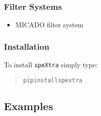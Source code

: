 \subsubsection{Filter Systems%
  \label{filter-systems}%
}

\begin{itemize}
\item MICADO filter system
\end{itemize}


\subsubsection{Installation%
  \label{installation}%
}

To install \texttt{speXtra} simply type:

\begin{quote}
\begin{alltt}
pip install spextra
\end{alltt}
\end{quote}


\subsection{Examples%
  \label{examples}%
}
